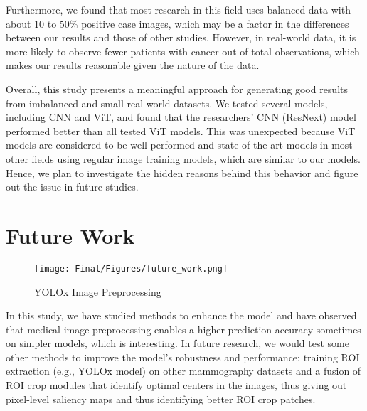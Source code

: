 \documentclass[11pt,letterpaper, twocolumn]{article}
\begin{document}
Furthermore, we found that most research in this field uses balanced data with about 10 to 50\% positive case images, which may be a factor in the differences between our results and those of other studies. However, in real-world data, it is more likely to observe fewer patients with cancer out of total observations, which makes our results reasonable given the nature of the data.

Overall, this study presents a meaningful approach for generating good results from imbalanced and small real-world datasets. We tested several models, including CNN and ViT, and found that the researchers' CNN (ResNext) model performed better than all tested ViT models. This was unexpected because ViT models are considered to be well-performed and state-of-the-art models in most other fields using regular image training models, which are similar to our models. Hence, we plan to investigate the hidden reasons behind this behavior and figure out the issue in future studies.

\section{Future Work}
\begin{figure*}[t]
    \centering
    \texttt{[image: Final/Figures/future\_work.png]}
    \caption{YOLOx Image Preprocessing}
\end{figure*}

In this study, we have studied methods to enhance the model and have observed that medical image preprocessing enables a higher prediction accuracy sometimes on simpler models, which is interesting. In future research, we would test some other methods to improve the model's robustness and performance: training ROI extraction (e.g., YOLOx model) on other mammography datasets and a fusion of ROI crop modules that identify optimal centers in the images, thus giving out pixel-level saliency maps and thus identifying better ROI crop patches.
\end{document}
